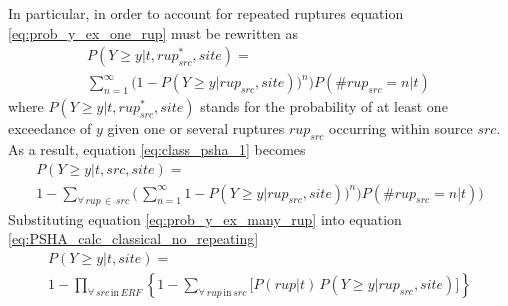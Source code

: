 In particular, in order to account for repeated ruptures equation 
\ref{eq:prob_y_ex_one_rup} must be rewritten as 
\begin{multline}
P(Y \geq y|t,rup_{src}^{*},site) = \\
	\sum\limits_{n=1}^{\infty}
	\bigl(1 - P(Y\geq y|rup_{src},site))^{n}\bigr)
	P(\#rup_{src}=n|t)\,
\label{eq:prob_y_ex_many_rup}
\end{multline}
where $P(Y \geq y|t,rup_{src}^*,site)$ stands for the 
probability of at least one exceedance of $y$ given one or several 
ruptures $rup_{src}$ occurring within source $src$.
% 
As a result, equation \ref{eq:class_psha_1} becomes 
\begin{multline}
P(Y \geq y|t,src,site) = \\
1 - \sum_{\forall\,rup\,\in\,src}^{} 
	\biggl(\,
	\sum\limits_{n=1}^{\infty}
	1 - P(Y\geq y|rup_{src},site))^{n}\bigr)
	P(\#rup_{src}=n|t)
	\biggr)
\end{multline}
%
Substituting equation \ref{eq:prob_y_ex_many_rup} into equation 
\ref{eq:PSHA_calc_classical_no_repeating}
\begin{multline}
P(Y \geq y|t,site) = \\
	1-\prod\limits_{\forall\,src\,\text{in}\,ERF}^{}
	\left\{
		1-\sum\limits_{\forall\,rup\,\text{in}\,src}^{} 
			\biggl[ P(rup|t)\,P(Y\geq y|rup_{src},site)
			\biggr]
	\right\}
\end{multline}
